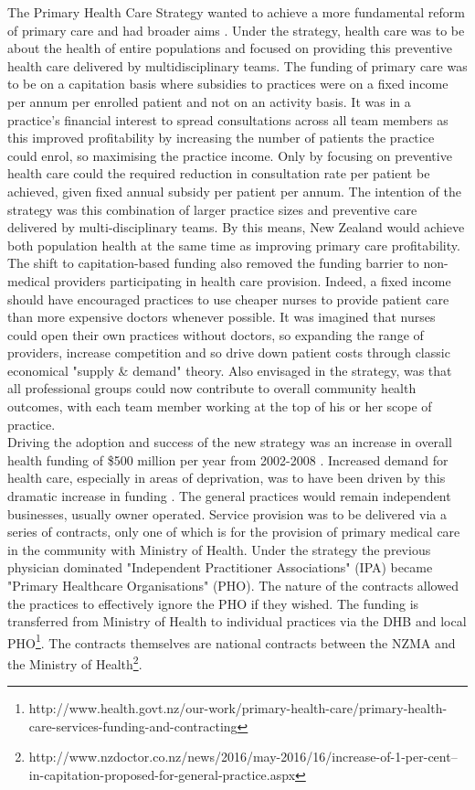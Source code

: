 \documentclass[11pt,a4paper]{article}
\begin{document}
The Primary Health Care Strategy wanted to achieve a more fundamental reform of primary care and had broader aims \citep{king2001primary}. Under the strategy, health care was to be about the health of entire populations and focused on providing this preventive health care delivered by multidisciplinary teams. The funding of primary care was to be on a capitation basis where subsidies to practices were on a fixed income per annum per enrolled patient and not on an activity basis. It was in a practice's financial interest to spread consultations across all team members as this improved profitability by increasing the number of patients the practice could enrol, so maximising the practice income. Only by focusing on preventive health care could the required reduction in consultation rate per patient be achieved, given fixed annual subsidy per patient per annum. The intention of the strategy was this combination of larger practice sizes and preventive care delivered by multi-disciplinary teams. By this means, New Zealand would achieve both population health at the same time as improving primary care profitability\citep{king2001primary}.\\

The shift to capitation-based funding also removed the funding barrier to non-medical providers participating in health care provision. Indeed, a fixed income should have encouraged practices to use cheaper nurses to provide patient care than more expensive doctors whenever possible. It was imagined that nurses could open their own practices without doctors, so expanding the range of providers, increase competition and so drive down patient costs through classic economical "supply \& demand" theory. Also envisaged in the strategy, was that all professional groups could now contribute to overall community health outcomes, with each team member working at the top of his or her scope of practice.\\

Driving the adoption and success of the new strategy was an increase in overall health funding of \$500 million per year from 2002-2008 \citep{gauld2006new}. Increased demand for health care, especially in areas of deprivation, was to have been driven by this dramatic increase in funding \citep{king2001primary}. The general practices would remain independent businesses, usually owner operated. Service provision was to be delivered via a series of contracts, only one of which is for the provision of primary medical care in the community with Ministry of Health. Under the strategy the previous physician dominated "Independent Practitioner Associations" (IPA) became "Primary Healthcare Organisations" (PHO). The nature of the contracts allowed the practices to effectively ignore the PHO if they wished. The funding is transferred from Ministry of Health to individual practices via the DHB and local PHO\footnote{http://www.health.govt.nz/our-work/primary-health-care/primary-health-care-services-funding-and-contracting}. The contracts themselves are national contracts between the NZMA and the Ministry of Health\footnote{http://www.nzdoctor.co.nz/news/2016/may-2016/16/increase-of-1-per-cent--in-capitation-proposed-for-general-practice.aspx}.\\
\end{document}
